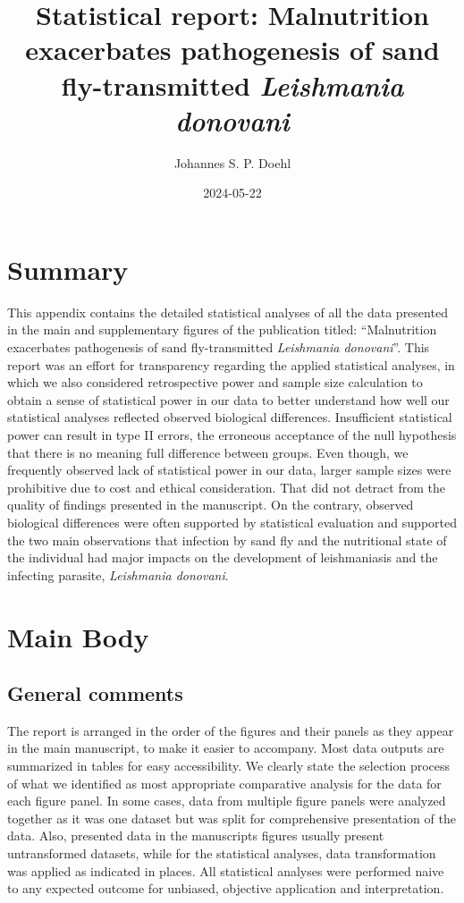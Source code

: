 \documentclass[
  12pt,
  letterpaper,
]{article}
\title{Statistical report: Malnutrition exacerbates pathogenesis of sand fly-transmitted \emph{Leishmania donovani}}
\author{Johannes S. P. Doehl}
\date{2024-05-22}
\begin{document}
\maketitle

\section{Summary}\label{summary}

This appendix contains the detailed statistical analyses of all the data presented in the main and supplementary figures of the publication titled: ``Malnutrition exacerbates pathogenesis of sand fly-transmitted \emph{Leishmania donovani}''. This report was an effort for transparency regarding the applied statistical analyses, in which we also considered retrospective power and sample size calculation to obtain a sense of statistical power in our data to better understand how well our statistical analyses reflected observed biological differences. Insufficient statistical power can result in type II errors, the erroneous acceptance of the null hypothesis that there is no meaning full difference between groups. Even though, we frequently observed lack of statistical power in our data, larger sample sizes were prohibitive due to cost and ethical consideration. That did not detract from the quality of findings presented in the manuscript. On the contrary, observed biological differences were often supported by statistical evaluation and supported the two main observations that infection by sand fly and the nutritional state of the individual had major impacts on the development of leishmaniasis and the infecting parasite, \emph{Leishmania donovani}.

\section{Main Body}\label{main-body}

\subsection{General comments}\label{general-comments}

The report is arranged in the order of the figures and their panels as they appear in the main manuscript, to make it easier to accompany. Most data outputs are summarized in tables for easy accessibility. We clearly state the selection process of what we identified as most appropriate comparative analysis for the data for each figure panel. In some cases, data from multiple figure panels were analyzed together as it was one dataset but was split for comprehensive presentation of the data. Also, presented data in the manuscripts figures usually present untransformed datasets, while for the statistical analyses, data transformation was applied as indicated in places. All statistical analyses were performed naive to any expected outcome for unbiased, objective application and interpretation.
\end{document}
